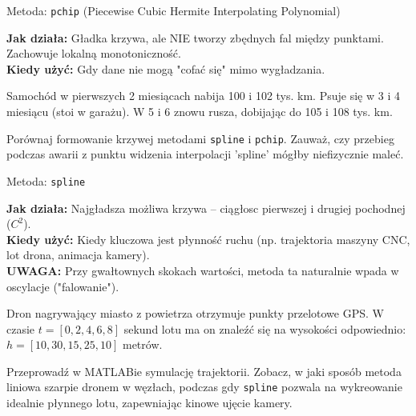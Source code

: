 \documentclass[11pt,aspectratio=169,table]{beamer}
\begin{document}
\begin{frame}{Metoda: \texttt{pchip} (Piecewise Cubic Hermite Interpolating Polynomial)}
	\begin{tcolorbox}[colback=orange!5!white,colframe=orange!75!black,title=Charakterystyka]
		\textbf{Jak działa:} Gładka krzywa, ale NIE tworzy zbędnych fal między punktami. Zachowuje lokalną monotoniczność.\\
		\textbf{Kiedy użyć:} Gdy dane nie mogą "cofać się" mimo wygładzania.
	\end{tcolorbox}
		
	\begin{tcolorbox}[colback=white,colframe=black,title=Zadanie]
		Samochód w pierwszych 2 miesiącach nabija 100 i 102 tys. km. Psuje się w 3 i 4 miesiącu (stoi w garażu). W 5 i 6 znowu rusza, dobijając do 105 i 108 tys. km. 
		
		Porównaj formowanie krzywej metodami \texttt{spline} i \texttt{pchip}. Zauważ, czy przebieg podczas awarii z punktu widzenia interpolacji 'spline' mógłby niefizycznie maleć.
	\end{tcolorbox}
\end{frame}

\begin{frame}{Metoda: \texttt{spline}}
	\vspace{-1em}
	\begin{tcolorbox}[colback=red!5!white,colframe=red!75!black,title=Charakterystyka]
		\textbf{Jak działa:} Najgładsza możliwa krzywa – ciągłosc pierwszej i drugiej pochodnej ($C^2$).\\
		\textbf{Kiedy użyć:} Kiedy kluczowa jest płynność ruchu (np. trajektoria maszyny CNC, lot drona, animacja kamery).\\
		\textbf{\alert{UWAGA:}} Przy gwałtownych skokach wartości, metoda ta naturalnie wpada w oscylacje ("falowanie").
	\end{tcolorbox}
	
	\begin{tcolorbox}[colback=white,colframe=black,title=Zadanie]
		Dron nagrywający miasto z powietrza otrzymuje punkty przelotowe GPS. 
		W czasie $t = [0, 2, 4, 6, 8]$ sekund lotu ma on znaleźć się na wysokości odpowiednio: $h = [10, 30, 15, 25, 10]$ metrów. 
		
		Przeprowadź w MATLABie symulację trajektorii. Zobacz, w jaki sposób metoda liniowa szarpie dronem w węzłach, podczas gdy \texttt{spline} pozwala na wykreowanie idealnie płynnego lotu, zapewniając kinowe ujęcie kamery.
	\end{tcolorbox}
\end{frame}
\end{document}
